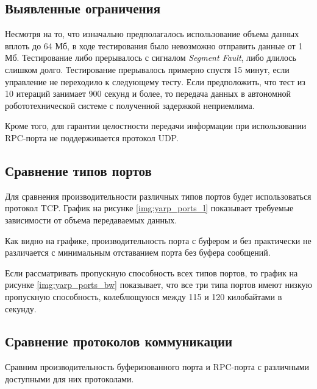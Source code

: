 \subsection{Выявленные ограничения}
Несмотря на то, что изначально предполагалось использование объема данных вплоть до 64 Мб, в ходе тестирования было невозможно отправить данные от 1 Мб. Тестирование либо прерывалось с сигналом \textit{Segment Fault}, либо длилось слишком долго. Тестирование прерывалось примерно спустя 15 минут, если управление не переходило к следующему тесту. Если предположить, что тест из 10 итераций занимает 900 секунд и более, то передача данных в автономной робототехнической системе с полученной задержкой неприемлима.

Кроме того, для гарантии целостности передачи информации при использовании RPC-порта не поддерживается протокол UDP.

\subsection{Сравнение типов портов}
Для сравнения производительности различных типов портов будет использоваться протокол TCP. График на рисунке \ref{img:yarp_ports_l} показывает требуемые зависимости от объема передаваемых данных.

Как видно на графике, производительность порта с буфером и без практически не различается с минимальным отставанием порта без буфера сообщений.

Если рассматривать пропускную способность всех типов портов, то график на рисунке \ref{img:yarp_ports_bw} показывает, что все три типа портов имеют низкую пропускную способность, колеблющуюся между 115 и 120 килобайтами в секунду.

\subsection{Сравнение протоколов коммуникации}

Сравним производительность буферизованного порта и RPC-порта с различными доступными для них протоколами.


